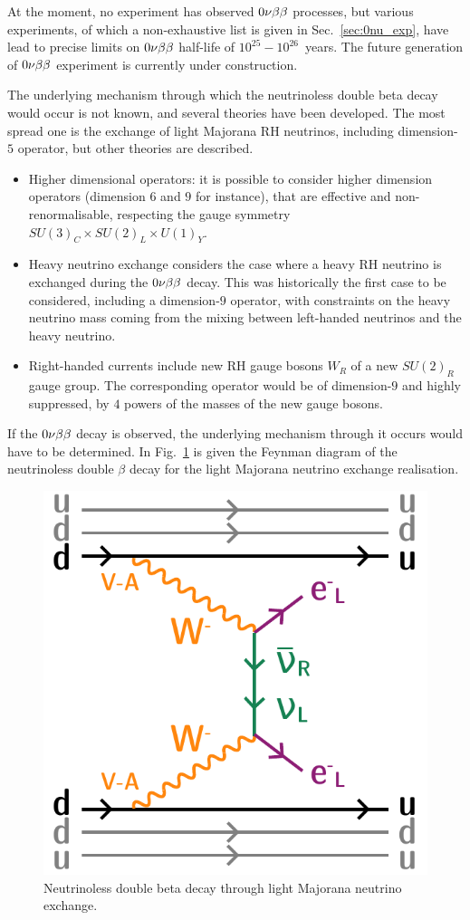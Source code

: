 At the moment, no experiment has observed $0\nu\beta\beta$ processes, but various experiments, of which a non-exhaustive list is given in Sec.~\ref{sec:0nu_exp}, have lead to precise limits on $0\nu\beta\beta$ half-life of $10^{25}-10^{26}$~years.
The future generation of $0\nu\beta\beta$ experiment is currently under construction.

The underlying mechanism through which the neutrinoless double beta decay would occur is not known, and several theories have been developed.
The most spread one is the exchange of light Majorana RH neutrinos, including dimension-$5$ operator, but other theories are described.
\begin{itemize}
\item Higher dimensional operators: it is possible to consider higher dimension operators (dimension $6$ and $9$ for instance), that are effective and non-renormalisable, respecting the gauge symmetry ${SU(3)_C\times SU(2)_L\times U(1)_Y}$.
\item Heavy neutrino exchange considers the case where a heavy RH neutrino is exchanged during the $0\nu\beta\beta$ decay.
  This was historically the first case to be considered, including a dimension-$9$ operator, with constraints on the heavy neutrino mass coming from the mixing between left-handed neutrinos and the heavy neutrino.
\item Right-handed currents include new RH gauge bosons $W_R$ of a new $SU(2)_R$ gauge group.
  The corresponding operator would be of dimension-$9$ and highly suppressed, by $4$ powers of the masses of the new gauge bosons.
\end{itemize}
If the $0\nu\beta\beta$ decay is observed, the underlying mechanism through it occurs would have to be determined.
In Fig.~\ref{fig:0nu_diagram} is given the Feynman diagram of the neutrinoless double $\beta$ decay for the light Majorana neutrino exchange realisation.


\begin{figure}[h!]
  \centering
    \includegraphics[height=0.4\textwidth]{neutrinophysics/fig_neutrinophysics/0nubb_diagram.pdf}
  \caption{Neutrinoless double beta decay through light Majorana neutrino exchange.
    \label{fig:0nu_diagram}}
\end{figure}


